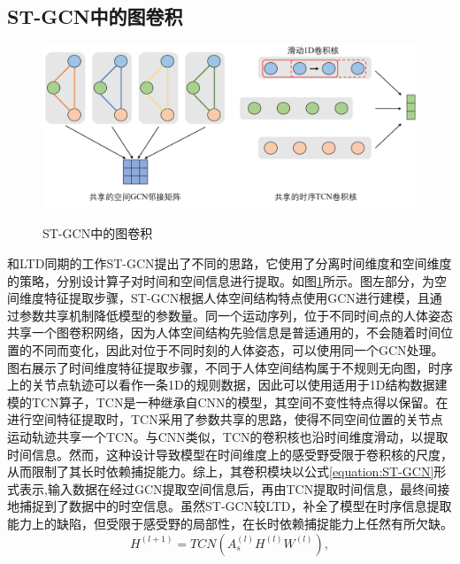\subsection{ST-GCN中的图卷积}
\begin{figure}[ht]
    \centering
    \includegraphics[width=1\textwidth]{FigMa/ST-GCN.png}\\
    \vspace{-0.3cm}
    \caption{ST-GCN中的图卷积}
    \label{fig:ST-GCN_structure}
\end{figure}
和LTD同期的工作ST-GCN\parencite{yan2018spatial}提出了不同的思路，它使用了分离时间维度和空间维度的策略，分别设计算子对时间和空间信息进行提取。如图\ref{fig:ST-GCN_structure}所示。图左部分，为空间维度特征提取步骤，ST-GCN根据人体空间结构特点使用GCN进行建模，且通过参数共享机制降低模型的参数量。同一个运动序列，位于不同时间点的人体姿态共享一个图卷积网络，因为人体空间结构先验信息是普适通用的，不会随着时间位置的不同而变化，因此对位于不同时刻的人体姿态，可以使用同一个GCN处理。图右展示了时间维度特征提取步骤，不同于人体空间结构属于不规则无向图，时序上的关节点轨迹可以看作一条1D的规则数据，因此可以使用适用于1D结构数据建模的TCN\parencite{oord2016wavenet}算子，TCN是一种继承自CNN的模型，其空间不变性特点得以保留。在进行空间特征提取时，TCN采用了参数共享的思路，使得不同空间位置的关节点运动轨迹共享一个TCN。与CNN类似，TCN的卷积核也沿时间维度滑动，以提取时间信息。然而，这种设计导致模型在时间维度上的感受野受限于卷积核的尺度，从而限制了其长时依赖捕捉能力。综上，其卷积模块以公式\ref{equation:ST-GCN}形式表示,输入数据在经过GCN提取空间信息后，再由TCN提取时间信息，最终间接地捕捉到了数据中的时空信息。虽然ST-GCN较LTD，补全了模型在时序信息提取能力上的缺陷，但受限于感受野的局部性，在长时依赖捕捉能力上任然有所欠缺。
\begin{equation}
    {H}^{(l+1)}= TCN({A}_{s}^{(l)}{H}^{(l)}{W}^{(l)}),
    \label{equation:ST-GCN}
\end{equation}

